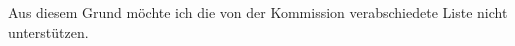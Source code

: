 \begin{center}
{\begin{minipage}{.95\textwidth}
            Aus diesem Grund möchte ich die von der Kommission verabschiedete Liste nicht unterstützen.
            \vspace{0.4 cm}
        \end{minipage}
    }
\end{center}

